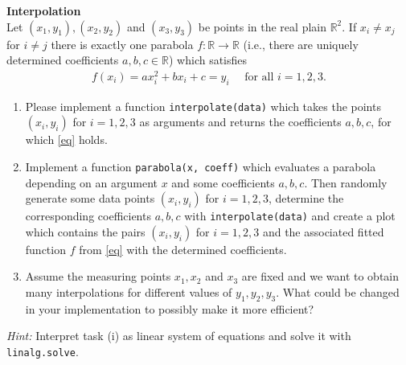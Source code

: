 \textbf{Interpolation}\\
Let $(x_1,y_1), (x_2,y_2)$ and $(x_3,y_3)$ be points in the real plain $\mathbb{R}^2$. If $x_i \neq x_j$ for $i \neq j$ there is exactly one 
parabola $f\colon \mathbb{R} \to \mathbb{R}$ (i.e., there are uniquely determined coefficients $a,b,c \in \mathbb{R}$) which satisfies
\begin{align}
f(x_i) = ax_i^2 + b x_i + c = y_i \label{eq} ~~~~~~\text{for all $i=1,2,3$.}
\end{align}

\begin{enumerate}
	\item Please implement a function \verb|interpolate(data)| which takes the points $(x_i, y_i)$ for $i=1,2,3$ as arguments and returns
	the coefficients $a,b,c$, for which \eqref{eq} holds.
	\item Implement a function \verb|parabola(x, coeff)| which evaluates a parabola depending on an argument $x$ and some coefficients $a,b,c$. Then randomly generate some data points $(x_i, y_i)$ for $i=1,2,3$, determine the corresponding coefficients $a,b,c$ with \verb|interpolate(data)| and create a plot which contains the pairs $(x_i, y_i)$ for $i=1,2,3$ and the associated fitted function $f$ from \eqref{eq} with the determined coefficients.
	\item Assume the measuring points $x_1, x_2$ and $x_3$ are fixed and we want to obtain many interpolations for different values of $y_1, y_2, y_3$. What could be changed in your implementation to possibly make it more efficient?
\end{enumerate}
\textit{Hint: } Interpret task (i) as linear system of equations and solve it with \verb|linalg.solve|. 

